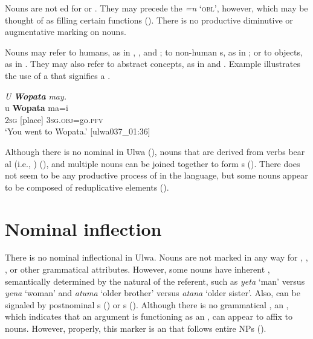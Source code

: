   Nouns are not ed for  or . They may precede the  \textit{=n} ‘\textsc{obl}’, however, which may be thought of as filling certain   functions (). There is no productive diminutive or augmentative marking on nouns.

Nouns may refer to humans, as in , , and ; to non-human s, as in ; or to  objects, as in . They may also refer to abstract concepts, as in   and . Example  illustrates the use of a  that signifies a .

\ea%
    \label{ex:nouns:11}
            \textit{U} \textbf{\textit{Wopata}} \textit{may.}\\
\gll  u     \textbf{Wopata}   ma=i\\
    2\textsc{sg}  [place]    3\textsc{sg.obj}=go.\textsc{pfv}\\
\glt `You went to Wopata.’ [ulwa037\_01:36]
\z

  Although there is no nominal  in Ulwa (), nouns that are derived from verbs bear al (i.e., )  (), and multiple nouns can be joined together to form s (). There does not seem to be any productive process of  in the language, but some nouns appear to be composed of reduplicative elements ().


\section{Nominal inflection}\label{sec:3.1}


There is no nominal inflectional  in Ulwa. Nouns are not marked in any way for , , , or other grammatical attributes. However, some nouns have inherent , semantically determined by the natural  of the referent, such as \textit{yeta} ‘man’ versus \textit{yena} ‘woman’ and \textit{atuma} ‘older brother’ versus \textit{atana} ‘older sister’. Also,  can be signaled by postnominal s () or s (). Although there is no grammatical , an , which indicates that an argument is functioning as an , can appear to affix to nouns. However, properly, this marker is an  that follows entire NPs ().

